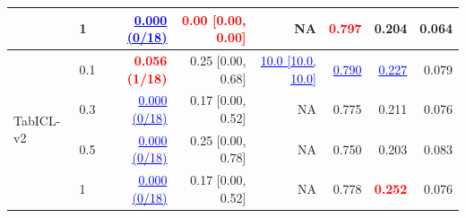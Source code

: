\begin{table}[pos=!htbp,align=\centering]
{\begin{tabular}{llrrrrrr}
 & 1 & \textcolor{blue}{\underline{0.000 (0/18)}} & \textcolor{red}{\textbf{0.00 [0.00, 0.00]}} & NA & \textcolor{red}{\textbf{0.797}} & 0.204 & 0.064 \\
\midrule
\multirow{4}{*}{TabICL-v2} & 0.1 & \textcolor{red}{\textbf{0.056 (1/18)}} & 0.25 [0.00, 0.68] & \textcolor{blue}{\underline{10.0 [10.0, 10.0]}} & \textcolor{blue}{\underline{0.790}} & \textcolor{blue}{\underline{0.227}} & 0.079 \\
 & 0.3 & \textcolor{blue}{\underline{0.000 (0/18)}} & 0.17 [0.00, 0.52] & NA & 0.775 & 0.211 & 0.076 \\
 & 0.5 & \textcolor{blue}{\underline{0.000 (0/18)}} & 0.25 [0.00, 0.78] & NA & 0.750 & 0.203 & 0.083 \\
 & 1 & \textcolor{blue}{\underline{0.000 (0/18)}} & 0.17 [0.00, 0.52] & NA & 0.778 & \textcolor{red}{\textbf{0.252}} & 0.076 \\
\bottomrule
\end{tabular}
}
\end{table}
